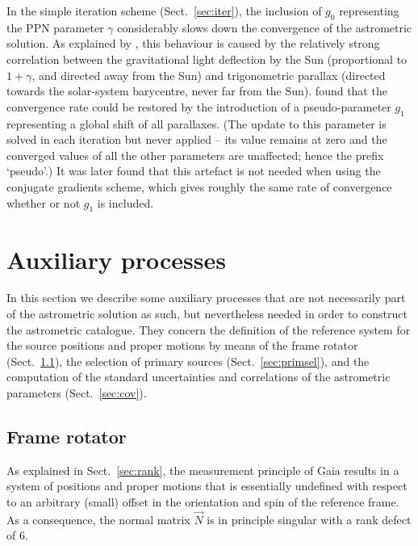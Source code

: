 \documentclass[structabstract]{aa}
\begin{document}
In the simple iteration scheme (Sect.~\ref{sec:iter}), the inclusion of
$g_0$ representing the PPN parameter $\gamma$ considerably slows 
down the convergence of the astrometric solution. As explained by
\citet{hobbs+2010}, this behaviour is caused by the relatively strong 
correlation between the gravitational light deflection by the Sun 
(proportional to $1+\gamma$, and directed away from the Sun) and 
trigonometric parallax (directed towards the solar-system barycentre, 
never far from the Sun). 
\citet{hobbs+2010} found that the convergence rate could be
restored by the introduction of a  pseudo-parameter $g_1$ representing 
a global shift of all parallaxes. (The update to this parameter is solved 
in each iteration but never applied -- its value remains at zero and the
converged values of all the other parameters are unaffected; 
hence the prefix `pseudo'.) It was later found that this artefact is not needed 
when using the conjugate gradients scheme, which gives roughly the same
rate of convergence whether or not $g_1$ is included.


\section{Auxiliary processes}\label{sec:aux}

In this section we describe some auxiliary processes that are not
necessarily part of the astrometric solution as such, but nevertheless
needed in order to construct the astrometric catalogue. They concern
the definition of the reference system for the source positions and
proper motions by means of the frame rotator (Sect.~\ref{sec:framerotator}),
the selection of primary sources (Sect.~\ref{sec:primsel}),
and the computation of the standard uncertainties and correlations of the
astrometric parameters (Sect.~\ref{sec:cov}).  


\subsection{Frame rotator} \label{sec:framerotator}

As explained in Sect.~\ref{sec:rank}, the measurement principle of Gaia 
results in a system of positions and proper motions that is essentially
undefined with respect to an arbitrary (small) offset in the orientation and
spin of the reference frame. As a consequence, the normal matrix $\vec{N}$ 
is in principle singular with a rank defect of 6. 
\end{document}
